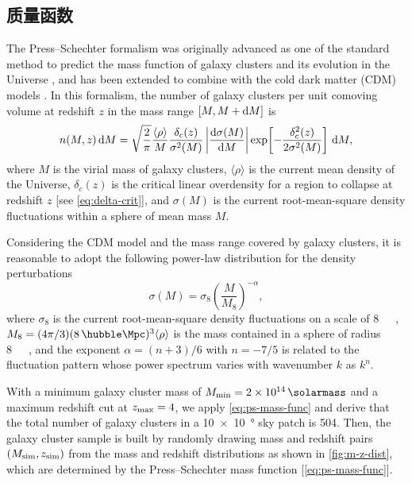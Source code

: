 \subsection{质量函数}
\label{sec:mass-function}

The Press--Schechter formalism was originally advanced as one of the standard
method to predict the mass function of galaxy clusters and its evolution
in the Universe \cite{press1974}, and has been extended to combine with
the cold dark matter (CDM) models \cite{bond1991,lacey1993}.
In this formalism, the number of galaxy clusters per unit comoving volume
at redshift $z$ in the mass range $[M, M + \mathrm{d}M]$ is
\begin{equation}
  \label{eq:ps-mass-func}
  n(M, z) \,\mathrm{d}M =
    \sqrt{\frac{2}{\pi}} \frac{\langle{\rho}\rangle}{M}
    \frac{\delta_c(z)}{\sigma^2(M)} \left| \frac{\mathrm{d}\sigma(M)}{\mathrm{d}M} \right|
    \exp\!\left[ -\frac{\delta_c^2(z)}{2\sigma^2(M)} \right] \,\mathrm{d}M,
\end{equation}
where $M$ is the virial mass of galaxy clusters,
$\langle {\rho} \rangle$ is the current mean density of the Universe,
$\delta_c(z)$ is the critical linear overdensity for a region to collapse
at redshift $z$ [see \autoref{eq:delta-crit}],
and $\sigma(M)$ is the current root-mean-square density
fluctuations within a sphere of mean mass $M$.

Considering the CDM model and the mass range covered by galaxy clusters,
it is reasonable to adopt the following power-law distribution for the
density perturbations \cite{sarazin2002,randall2002}
\begin{equation}
  \label{eq:sigma-mass}
  \sigma(M) = \sigma_8 \left( \frac{M}{M_8} \right)^{-\alpha},
\end{equation}
where $\sigma_8$ is the current root-mean-square density fluctuations on
a scale of \SI{8}{\per\hubble\Mpc},
$M_8 = (4\pi/3)(8 \,\si{\per\hubble\Mpc})^3 \langle{\rho}\rangle$
is the mass contained in a sphere of radius \SI{8}{\per\hubble\Mpc},
and the exponent $\alpha = (n+3)/6$ with $n = -7/5$ \cite{randall2002}
is related to the fluctuation pattern whose power spectrum varies
with wavenumber $k$ as $k^n$.

With a minimum galaxy cluster mass of
$M_{\R{min}} = \SI{2e14}{\solarmass}$
and a maximum redshift cut at $z_{\mathrm{max}} = 4$,
we apply \autoref{eq:ps-mass-func} and derive
that the total number of galaxy clusters in a
\SI{10 x 10}{\degree} sky patch is 504.
Then, the galaxy cluster sample is built by randomly drawing mass and
redshift pairs $(M_{\mathrm{sim}}, z_{\mathrm{sim}})$ from the
mass and redshift distributions as shown in \autoref{fig:m-z-dist},
which are determined by the Press--Schechter mass function
[\autoref{eq:ps-mass-func}].

